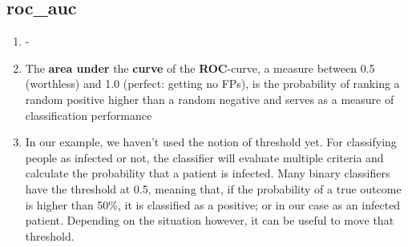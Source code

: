 \documentclass[12pt,a4paper]{article}
\begin{document}
\subsection{roc\_auc}
\begin{enumerate}
\item -
\item The \textbf{area under} the \textbf{curve} of the \textbf{ROC}-curve, a measure between 0.5 (worthless) and 1.0 (perfect: getting no FPs), is the probability of ranking a random positive higher than a random negative and serves as a measure of classification performance
\item In our example, we haven't used the notion of threshold yet. For classifying people as infected or not, the classifier will evaluate multiple criteria and calculate the probability that a patient is infected. Many binary classifiers have the threshold at 0.5, meaning that, if the probability of a true outcome is higher than 50\%, it is classified as a positive; or in our case as an infected patient. Depending on the situation however, it can be useful to move that threshold.
\end{enumerate}
\end{document}
